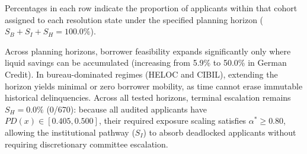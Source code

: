 \documentclass[manuscript,screen,review,anonymous]{acmart}
\begin{document}
\begin{table}[!htbp]
\centering
\caption{Sensitivity Analysis: Effect of Planning Horizon ($H_{\max}$) on Recourse Feasibility Across Cohorts.}
\label{tab:sensitivity_horizon}
\small
\setlength{\tabcolsep}{3.5pt}
\par\vspace{2pt}\footnotesize{Percentages in each row indicate the proportion of applicants within that cohort assigned to each resolution state under the specified planning horizon ($S_B + S_I + S_H = 100.0\%$).}
\end{table}

Across planning horizons, borrower feasibility expands significantly only where liquid savings can be accumulated (increasing from 5.9\% to 50.0\% in German Credit). In bureau-dominated regimes (HELOC and CIBIL), extending the horizon yields minimal or zero borrower mobility, as time cannot erase immutable historical delinquencies. Across all tested horizons, terminal escalation remains $S_H = 0.0\%$ (0/670): because all audited applicants have $PD(x) \in [0.405, 0.500]$, their required exposure scaling satisfies $\alpha^* \ge 0.80$, allowing the institutional pathway ($S_I$) to absorb deadlocked applicants without requiring discretionary committee escalation.
\end{document}
